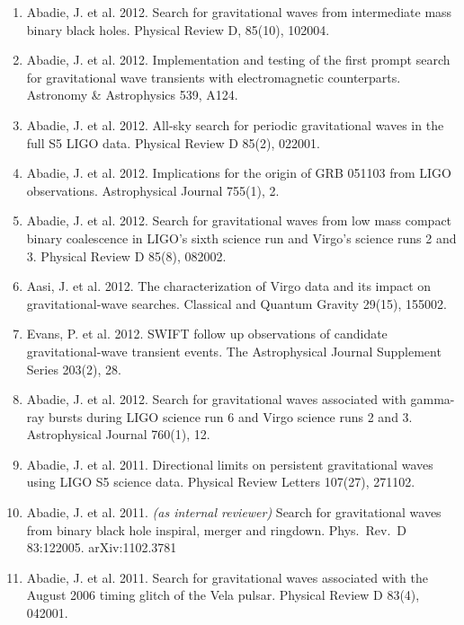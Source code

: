 \documentclass[margin,line]{res}
\begin{document}
\begin{resume}
\begin{enumerate}
\item Abadie, J. et al. 2012. Search for gravitational waves from intermediate mass binary black holes. Physical Review D, 85(10), 102004. 

\item Abadie, J. et al. 2012. Implementation and testing of the first prompt search for gravitational wave transients with electromagnetic counterparts. Astronomy \& Astrophysics 539, A124.

\item Abadie, J. et al. 2012. All-sky search for periodic gravitational waves in the full S5 LIGO data. Physical Review D 85(2), 022001.

\item Abadie, J. et al. 2012. Implications for the origin of GRB 051103 from LIGO observations. Astrophysical Journal 755(1), 2. 

\item Abadie, J. et al. 2012. Search for gravitational waves from low mass compact binary coalescence in LIGO's sixth science run and Virgo's science runs 2 and 3. Physical Review D 85(8), 082002.

\item Aasi, J. et al. 2012. The characterization of Virgo data and its impact on gravitational-wave searches. Classical and Quantum Gravity 29(15), 155002.

\item Evans, P. et al. 2012. SWIFT follow up observations of candidate gravitational-wave transient events. The Astrophysical Journal Supplement Series 203(2), 28. 

\item Abadie, J. et al. 2012. Search for gravitational waves associated with gamma-ray bursts during LIGO science run 6 and Virgo science runs 2 and 3. Astrophysical Journal 760(1), 12. 

\item Abadie, J. et al. 2011. Directional limits on persistent gravitational waves using LIGO S5 science data. Physical Review Letters 107(27),  271102. 

\item  Abadie, J. et al.  2011. {\it (as internal reviewer)}  Search for gravitational waves from binary black hole inspiral, merger and ringdown.  Phys.~Rev.~D 83:122005. arXiv:1102.3781

\item Abadie, J. et al. 2011. Search for gravitational waves associated with the August 2006 timing glitch of the Vela pulsar. Physical Review D 83(4), 042001.


\end{enumerate}
\end{resume}
\end{document}
